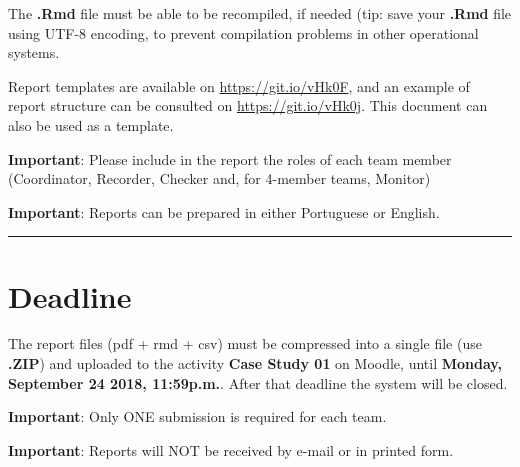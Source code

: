 \documentclass[letter,11pt,twoside,printwatermark=false]{pinp}
\begin{document}
The \textbf{.Rmd} file must be able to be recompiled, if needed (tip:
save your \textbf{.Rmd} file using UTF-8 encoding, to prevent
compilation problems in other operational systems.

Report templates are available on \url{https://git.io/vHk0F}, and an
example of report structure can be consulted on
\url{https://git.io/vHk0j}. This document can also be used as a
template.

\textbf{Important}: Please include in the report the roles of each team
member (Coordinator, Recorder, Checker and, for 4-member teams, Monitor)

\textbf{Important}: Reports can be prepared in either Portuguese or
English.

\begin{center}\rule{0.5\linewidth}{\linethickness}\end{center}

\section{Deadline}\label{deadline}

The report files (pdf + rmd + csv) must be compressed into a single file
(use \textbf{.ZIP}) and uploaded to the activity \textbf{Case Study 01}
on Moodle, until \textbf{Monday, September 24 2018, 11:59p.m.}. After
that deadline the system will be closed.

\textbf{Important}: Only ONE submission is required for each team.

\textbf{Important}: Reports will NOT be received by e-mail or in printed
form.

\end{document}
